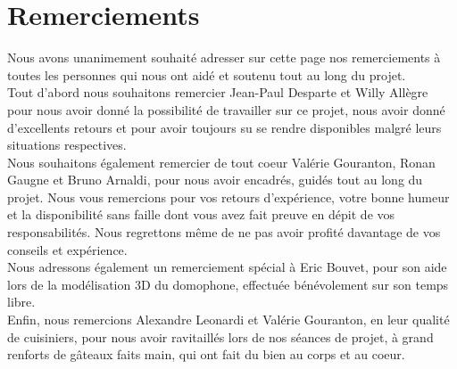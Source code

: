 \section{Remerciements}

Nous avons unanimement souhaité adresser sur cette page nos remerciements à toutes les personnes qui nous ont aidé et soutenu tout au long du projet.
\\ \newline
Tout d'abord nous souhaitons remercier Jean-Paul Desparte et Willy Allègre pour nous avoir donné la possibilité de travailler sur ce projet, nous avoir donné d'excellents retours et pour avoir toujours su se rendre disponibles malgré leurs situations respectives.
\\ \newline
Nous souhaitons également remercier de tout coeur Valérie Gouranton, Ronan Gaugne et Bruno Arnaldi, pour nous avoir encadrés, guidés tout au long du projet. Nous vous remercions pour vos retours d'expérience, votre bonne humeur et la disponibilité sans faille dont vous avez fait preuve en dépit de vos responsabilités. Nous regrettons même de ne pas avoir profité davantage de vos conseils et expérience.
\\ \newline
Nous adressons également un remerciement spécial à Eric Bouvet, pour son aide lors de la modélisation 3D du domophone, effectuée bénévolement sur son temps libre.
\\ \newline
Enfin, nous remercions Alexandre Leonardi et Valérie Gouranton, en leur qualité de cuisiniers, pour nous avoir ravitaillés lors de nos séances de projet, à grand renforts de gâteaux faits main, qui ont fait du bien au corps et au coeur.
